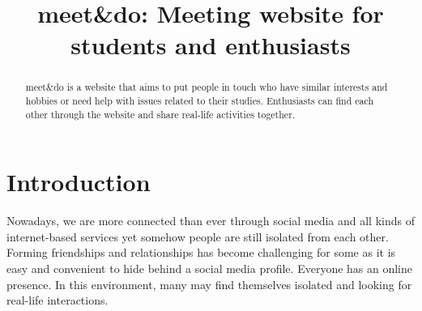 \documentclass[conference]{IEEEtran}
\begin{document}
\title{meet\&do: Meeting website for students and enthusiasts\\}

\author{
\and
{}
\and
{}
\and
{}
}

\maketitle

\begin{abstract}
meet\&do is a website that aims to put people in touch who have similar interests and hobbies or need help with issues related to their studies.
Enthusiasts can find each other through the website and share real-life activities together.
\end{abstract}

\section{Introduction}

Nowadays, we are more connected than ever through social media and all kinds of internet-based services yet somehow people are still isolated from each other.
Forming friendships and relationships has become challenging for some as it is easy and convenient to hide behind a social media profile.
Everyone has an online presence.
In this environment, many may find themselves isolated and looking for real-life interactions.
\end{document}
